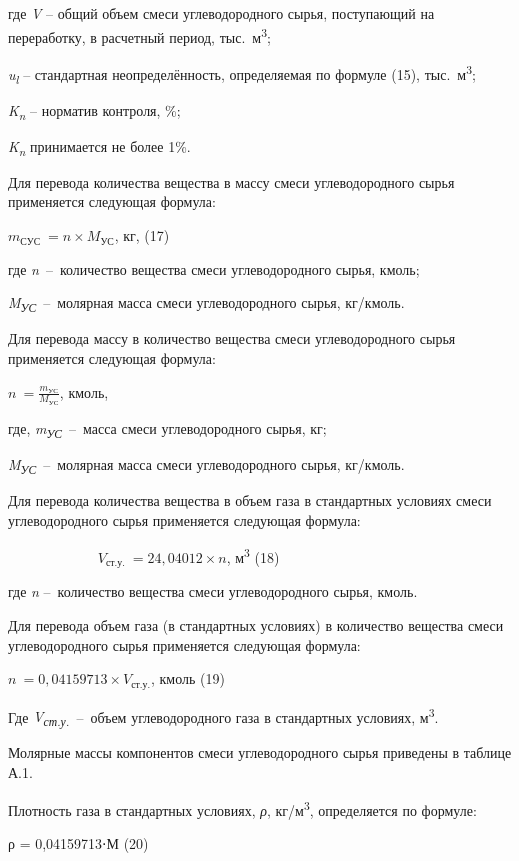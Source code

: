 где \emph{V} -- общий объем смеси углеводородного сырья, поступающий на
переработку, в расчетный период, тыс.~м\textsuperscript{3};

\emph{u\textsubscript{l}} -- стандартная неопределённость, определяемая
по формуле (15), тыс.~м\textsuperscript{3};

\emph{K\textsubscript{n}} -- норматив контроля, \%;

\emph{K\textsubscript{n}} принимается не более 1\%.

Для перевода количества вещества в массу смеси углеводородного сырья
применяется следующая формула:

\(m_{СУС}\  = n \times M_{УС}\), кг, (17)

где \emph{n}~--~количество вещества смеси углеводородного сырья, кмоль;

\emph{M\textsubscript{УС}}~--~молярная масса смеси углеводородного
сырья, кг/кмоль.

Для перевода массу в количество вещества смеси углеводородного сырья
применяется следующая формула:

\(n\  = \frac{m_{УС}}{M_{УС}}\), кмоль,

где, \emph{m\textsubscript{УС}}~--~масса смеси углеводородного сырья,
кг;

\emph{M\textsubscript{УС}}~--~молярная масса смеси углеводородного
сырья, кг/кмоль.

Для перевода количества вещества в объем газа в стандартных условиях
смеси углеводородного сырья применяется следующая формула:

\(\ \ \ \ \ \ \ \ \ \ \ \ \ \ \ \ \ \ \ \ \ \ \ \ \ \ \ \ \ V_{ст.у.}\  = 24,04012 \times n\),
м\textsuperscript{3} (18)

где \emph{n} --~количество вещества смеси углеводородного сырья, кмоль.

Для перевода объем газа (в стандартных условиях) в количество вещества
смеси углеводородного сырья применяется следующая формула:

\(n\  = 0,04159713 \times V_{ст.у.}\), кмоль (19)

Где \emph{V\textsubscript{ст.у.}}~--~объем углеводородного газа в
стандартных условиях, м\textsuperscript{3}.

Молярные массы компонентов смеси углеводородного сырья приведены в
таблице А.1.

Плотность газа в стандартных условиях, \emph{ρ},
кг/м\textsuperscript{3}, определяется по формуле:

ρ = 0,04159713⋅М (20)

